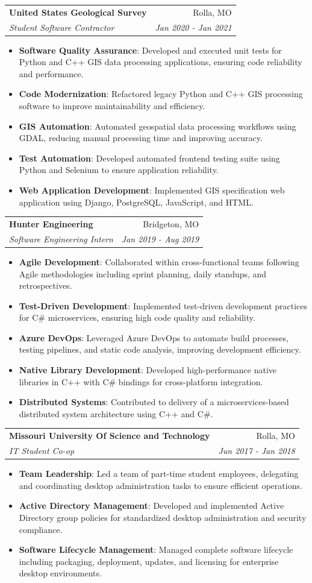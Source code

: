 \documentclass[letterpaper,11pt]{article}
\makeatletter
\newcommand{\resumeItem}[2]{
  \item\small{
    \textbf{#1}{: #2 \vspace{-2pt}}
  }
}
\newcommand{\resumeSubheading}[4]{
  \vspace{-1pt}\item
    \begin{tabular*}{0.97\textwidth}[t]{l@{\extracolsep{\fill}}r}
      \textbf{#1} & #2 \\
      \textit{\small#3} & \textit{\small #4} \\
    \end{tabular*}\vspace{-5pt}
}
\newcommand{\resumeItemListStart}{\begin{itemize}}
\newcommand{\resumeItemListEnd}{\end{itemize}\vspace{-5pt}}
\makeatother
\begin{document}
    \resumeSubheading
      {United States Geological Survey}{Rolla, MO}
      {Student Software Contractor}{Jan 2020 - Jan 2021}
      \resumeItemListStart
        \resumeItem{Software Quality Assurance}{Developed and executed unit tests for Python and C++ GIS data processing applications, ensuring code reliability and performance.}
        \resumeItem{Code Modernization}{Refactored legacy Python and C++ GIS processing software to improve maintainability and efficiency.}
        \resumeItem{GIS Automation}{Automated geospatial data processing workflows using GDAL, reducing manual processing time and improving accuracy.}
        \resumeItem{Test Automation}{Developed automated frontend testing suite using Python and Selenium to ensure application reliability.}
        \resumeItem{Web Application Development}{Implemented GIS specification web application using Django, PostgreSQL, JavaScript, and HTML.}
      \resumeItemListEnd

    \resumeSubheading
      {Hunter Engineering}{Bridgeton, MO}
      {Software Engineering Intern}{Jan 2019 - Aug 2019}
      \resumeItemListStart
        \resumeItem{Agile Development}{Collaborated within cross-functional teams following Agile methodologies including sprint planning, daily standups, and retrospectives.}
        \resumeItem{Test-Driven Development}{Implemented test-driven development practices for C\# microservices, ensuring high code quality and reliability.}
        \resumeItem{Azure DevOps}{Leveraged Azure DevOps to automate build processes, testing pipelines, and static code analysis, improving development efficiency.}
        \resumeItem{Native Library Development}{Developed high-performance native libraries in C++ with C\# bindings for cross-platform integration.}
        \resumeItem{Distributed Systems}{Contributed to delivery of a microservices-based distributed system architecture using C++ and C\#.}
      \resumeItemListEnd

    \resumeSubheading
      {Missouri University Of Science and Technology}{Rolla, MO}
      {IT Student Co-op}{Jun 2017 - Jan 2018}
      \resumeItemListStart
        \resumeItem{Team Leadership}{Led a team of part-time student employees, delegating and coordinating desktop administration tasks to ensure efficient operations.}
        \resumeItem{Active Directory Management}{Developed and implemented Active Directory group policies for standardized desktop administration and security compliance.}
        \resumeItem{Software Lifecycle Management}{Managed complete software lifecycle including packaging, deployment, updates, and licensing for enterprise desktop environments.}
      \resumeItemListEnd
\end{document}
